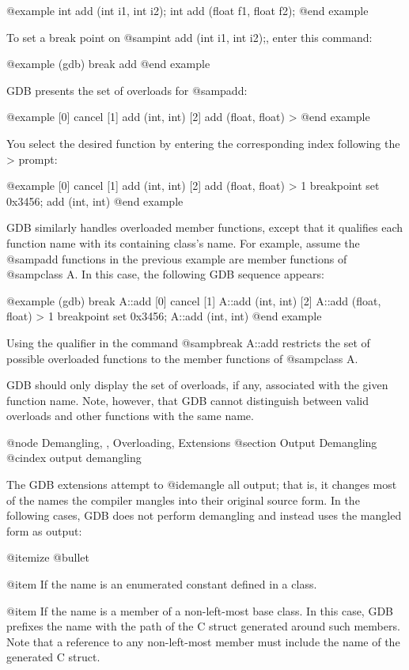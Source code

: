 @example
int add (int i1, int i2);
int add (float f1, float f2);
@end example

To set a break point on @samp{int add (int i1, int i2);}, 
enter this command:

@example
(gdb) break add
@end example

GDB presents the set of overloads for @samp{add}:

@example
[0] cancel
[1] add (int, int)
[2] add (float, float)
> 
@end example

You select the desired function by entering the corresponding
index following the > prompt:

@example
[0] cancel
[1] add (int, int)
[2] add (float, float)
> 1
breakpoint set 0x3456; add (int, int)
@end example

GDB similarly handles overloaded member functions, except that it
qualifies each function name with its containing class's name.  For
example, assume the @samp{add} functions in the previous example are
member functions of @samp{class A}. In this case, the following GDB
sequence appears:

@example
(gdb) break A::add
[0] cancel
[1] A::add (int, int)
[2] A::add (float, float)
> 1
breakpoint set 0x3456; A::add (int, int)
@end example

Using the qualifier in the command @samp{break A::add} restricts the
set of possible overloaded functions to the member functions of
@samp{class A}.

GDB should only display the set of overloads, if any, associated with
the given function name.  Note, however, that GDB cannot distinguish
between valid overloads and other functions with the same name.

@node Demangling, , Overloading, Extensions
@section Output Demangling
@cindex output demangling

The GDB extensions attempt to @i{demangle} all output; that is, it
changes most of the names the compiler mangles into their original
source form. In the following cases, GDB does not perform demangling
and instead uses the mangled form as output:

@itemize @bullet

@item
If the name is an enumerated constant defined in a class. 

@item
If the name is a member of a non-left-most base class. In this case,
GDB prefixes the name with the path of the C struct generated around
such members.  Note that a reference to any non-left-most member must
include the name of the generated C struct.

